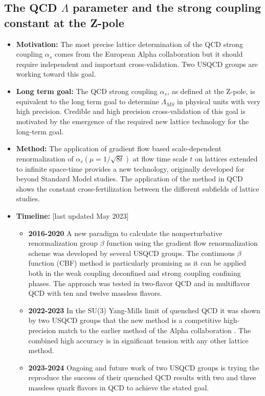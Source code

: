 \documentclass[12pt,hyperpdf]{article}
\begin{document}
\subsection{The QCD $\Lambda$ parameter and the  strong coupling constant at the Z-pole}
\begin{itemize}
	\item{\bf Motivation:}  The most precise lattice determination of
          the QCD strong coupling $\alpha_s$  comes from the European
          Alpha collaboration but  it should require independent and
          important  cross-validation. Two  USQCD  groups are working
          toward  this goal. 
	\item{\bf Long term goal:} The QCD strong coupling $\alpha_s$, as
          defined at the Z-pole, is equivalent to the long term goal
          to determine $\Lambda_{\overline{MS}}$  in physical units
          with very high precision. Credible and high precision
          cross-validation  of this goal  is motivated by the
          emergence of  the required new lattice  technology for the
          long-term goal. 
	\item{\bf Method:}  The application of gradient flow based
          scale-dependent renormalization of
          $\alpha_s(\mu=1/\sqrt{8t})$ at flow time scale $t$ on
          lattices extended to  infinite space-time provides a new
          technology, originally developed for beyond Standard Model studies. The application of the method in QCD shows the constant cross-fertilization  between the different subfields  of lattice studies. 
\item{\bf Timeline:} \hfill [last updated May 2023]
\begin{itemize}
	\item{\bf 2016-2020} A new paradigm to calculate the nonperturbative renormalization group $\beta$ function using the gradient flow renormalization scheme was developed by several USQCD groups. The continuous $\beta$ function (CBF) method is particularly promising as it can be applied both in the weak coupling deconfined and strong coupling confining phases. The  approach was
          tested in two-flavor QCD and in multiflavor QCD
          with ten and twelve massless flavors. 
	\item{\bf 2022-2023} In the SU(3) Yang-Mills limit of quenched QCD
          it was shown by two USQCD groups that the new method is a
          competitive high-precision match to the earlier method of
          the Alpha collaboration
          \cite{Hasenfratz:2023bok,Wong:2023jvr}. The combined high
          accuracy is in significant tension with any other lattice
          method. 
	\item{\bf 2023-2024}  Ongoing and future work of two USQCD groups
          is trying the reproduce the success of their quenched QCD
          results with two and three massless quark flavors in QCD to achieve
          the stated  goal.  
\end{itemize}
\end{itemize}
\end{document}
